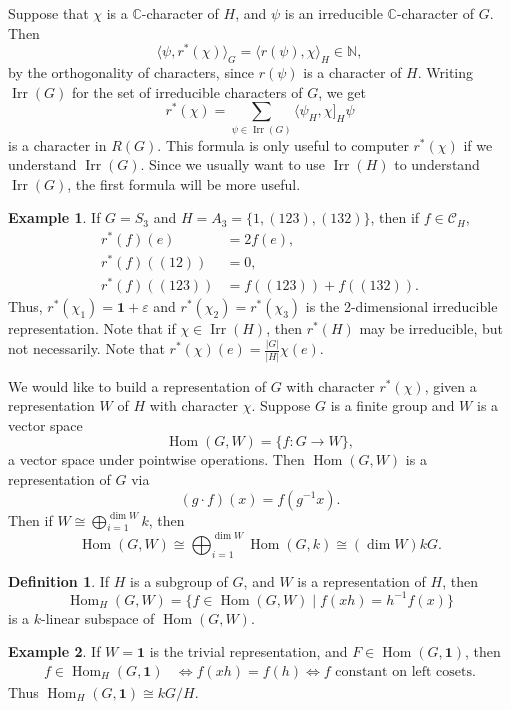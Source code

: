 \documentclass[12pt]{article}
\DeclareMathOperator{\Hom}{Hom}
\DeclareMathOperator{\Irr}{Irr}
\theoremstyle{definition}
\newtheorem{definition}{Definition}[section]
\newtheorem{example}{Example}[section]
\theoremstyle{remark}
\begin{document}
Suppose that $\chi$ is a $\mathbb{C}$-character of $H$, and $\psi$ is an irreducible $\mathbb{C}$-character of $G$. Then
\[
	\langle \psi, r^{\ast}(\chi)\rangle_{G} = \langle r(\psi), \chi \rangle_{H} \in \mathbb{N}
,\]
by the orthogonality of characters, since $r(\psi)$ is a character of $H$. Writing $\Irr(G)$ for the set of irreducible characters of $G$, we get
\[
	r^{\ast}(\chi) = \sum_{\psi \in \Irr(G)} \langle \psi_H, \chi]_{H} \psi
\]
is a character in $R(G)$. This formula is only useful to computer $r^{\ast}(\chi)$ if we understand $\Irr(G)$. Since we usually want to use $\Irr(H)$ to understand $\Irr(G)$, the first formula will be more useful.

\begin{adjustbox}{minipage = \columnwidth - 25.5pt, margin=1em, frame=1pt, margin=0em}
\begin{example}
	If $G = S_3$ and $H = A_3 = \{1, (123), (132)\}$, then if $f \in \mathcal{C}_H$,
	\begin{align*}
		r^{\ast}(f)(e) &= 2f(e), \\
		r^{\ast}(f)((12)) &= 0, \\
		r^{\ast}(f)((123)) &= f((123)) + f((132)).
	\end{align*}
	Thus, $r^{\ast}(\chi_1) = \mathbf{1} + \varepsilon$ and $r^{\ast}(\chi_2) = r^{\ast}(\chi_3)$ is the 2-dimensional irreducible representation. Note that if $\chi \in \Irr(H)$, then $r^{\ast}(H)$ may be irreducible, but not necessarily. Note that $r^{\ast}(\chi)(e) = \frac{|G|}{|H|} \chi(e)$.
\end{example}
\end{adjustbox}

We would like to build a representation of $G$ with character $r^{\ast}(\chi)$, given a representation $W$ of $H$ with character $\chi$. Suppose $G$ is a finite group and $W$ is a vector space
\[
	\Hom(G, W) = \{f : G \to W\}
,\]
a vector space under pointwise operations. Then $\Hom(G, W)$ is a representation of $G$ via
\[
	(g \cdot f)(x) = f(g^{-1}x)
.\]
Then if $W \cong \bigoplus_{i = 1}^{\dim W} k$, then
 \[
	 \Hom(G, W) \cong \bigoplus_{i = 1}^{\dim W}\Hom(G, k) \cong (\dim W) k G
.\]

\begin{definition}
	If $H$ is a subgroup of $G$, and $W$ is a representation of $H$, then
	\[
		\Hom_H(G, W) = \{f \in \Hom(G, W) \mid f(xh) = h^{-1}f(x)\}
	\]
	is a $k$-linear subspace of $\Hom(G, W)$.
\end{definition}

\begin{adjustbox}{minipage = \columnwidth - 25.5pt, margin=1em, frame=1pt, margin=0em}
\begin{example}
	If $W = \mathbf{1}$ is the trivial representation, and $F \in \Hom(G, \mathbf{1})$, then
	\begin{align*}
		f \in \Hom_H(G, \mathbf{1}) &\iff f(xh) = f(h) \iff f \text{ constant on left cosets}.
	\end{align*}
	Thus $\Hom_H(G, \mathbf{1}) \cong k G/H$.
\end{example}
\end{adjustbox}
\end{document}
